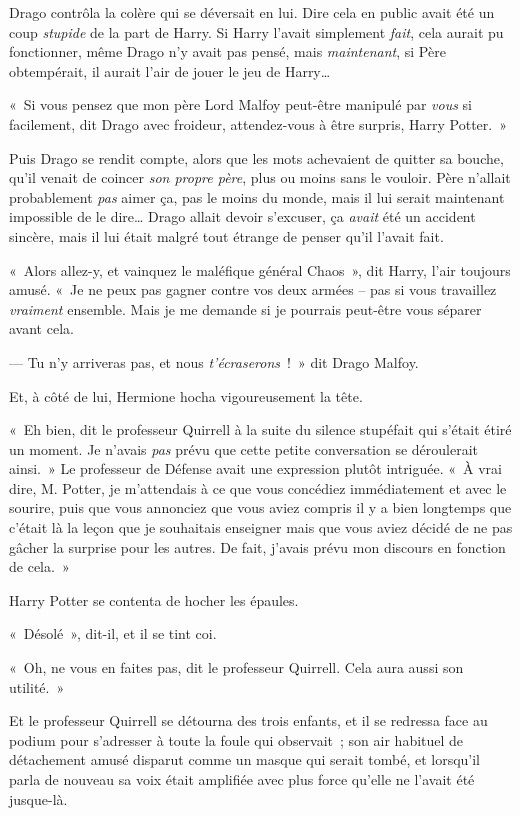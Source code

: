 Drago contrôla la colère qui se déversait en lui.
Dire cela en public avait été un coup \emph{stupide} de la part de Harry.
Si Harry l'avait simplement \emph{fait}, cela aurait pu fonctionner, même Drago n'y avait pas pensé, mais \emph{maintenant}, si Père obtempérait, il aurait l'air de jouer le jeu de Harry…

«~Si vous pensez que mon père Lord Malfoy peut-être manipulé par \emph{vous} si facilement, dit Drago avec froideur, attendez-vous à être surpris, Harry Potter.~»

Puis Drago se rendit compte, alors que les mots achevaient de quitter sa bouche, qu'il venait de coincer \emph{son propre père}, plus ou moins sans le vouloir.
Père n'allait probablement \emph{pas} aimer ça, pas le moins du monde, mais il lui serait maintenant impossible de le dire…
Drago allait devoir s'excuser, ça \emph{avait} été un accident sincère, mais il lui était malgré tout étrange de penser qu'il l'avait fait.

«~Alors allez-y, et vainquez le maléfique général Chaos~», dit Harry, l'air toujours amusé.
«~Je ne peux pas gagner contre vos deux armées -- pas si vous travaillez \emph{vraiment} ensemble.
Mais je me demande si je pourrais peut-être vous séparer avant cela.

--- Tu n'y arriveras pas, et nous \emph{t'écraserons}~!~»
dit Drago Malfoy.

Et, à côté de lui, Hermione hocha vigoureusement la tête.

«~Eh bien, dit le professeur Quirrell à la suite du silence stupéfait qui s'était étiré un moment.
Je n'avais \emph{pas} prévu que cette petite conversation se déroulerait ainsi.~»
Le professeur de Défense avait une expression plutôt intriguée.
«~À vrai dire, M. Potter, je m'attendais à ce que vous concédiez immédiatement et avec le sourire, puis que vous annonciez que vous aviez compris il y a bien longtemps que c'était là la leçon que je souhaitais enseigner mais que vous aviez décidé de ne pas gâcher la surprise pour les autres.
De fait, j'avais prévu mon discours en fonction de cela.~»

Harry Potter se contenta de hocher les épaules.

«~Désolé~», dit-il, et il se tint coi.

«~Oh, ne vous en faites pas, dit le professeur Quirrell.
Cela aura aussi son utilité.~»

Et le professeur Quirrell se détourna des trois enfants, et il se redressa face au podium pour s'adresser à toute la foule qui observait~; son air habituel de détachement amusé disparut comme un masque qui serait tombé, et lorsqu'il parla de nouveau sa voix était amplifiée avec plus force qu'elle ne l'avait été jusque-là.

